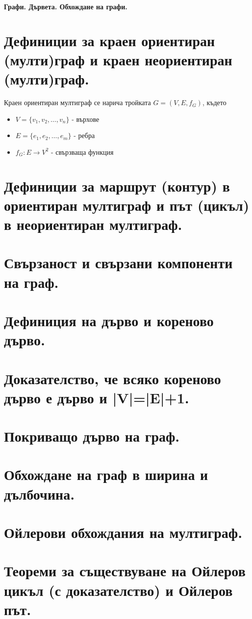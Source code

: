 \documentclass[fleqn,12pt]{article}
\begin{document}

\Large\center\textbf{Графи. Дървета. Обхождане на графи.}



\begin{flushleft}

\section{Дефиниции за краен ориентиран (мулти)граф и краен неориентиран (мулти)граф.}
Краен ориентиран мултиграф се нарича тройката $G = (V, E, f_G)$, където
\begin{itemize}
	\item $V = \{ v_1, v_2, \dots, v_n \}$ - върхове
	\item $E = \{ e_1, e_2, \dots, e_m \}$ - ребра
	\item $f_G : E \rightarrow V^2$ - свързваща функция
\end{itemize}


\section{Дефиниции за маршрут (контур) в ориентиран мултиграф и път (цикъл) в неориентиран мултиграф.}
\section{Свързаност и свързани компоненти на граф.} 
\section{Дефиниция на дърво и кореново дърво.}
\section{Доказателство, че всяко кореново дърво е дърво и |V|=|E|+1.}
\section{Покриващо дърво на граф.}
\section{Обхождане на граф в ширина и дълбочина.}
\section{Ойлерови обхождания на мултиграф.}
\section{Теореми за съществуване на Ойлеров цикъл (с доказателство) и Ойлеров път.}


\end{flushleft}
\end{document}
